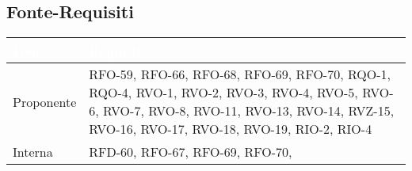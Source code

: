 \subsection{Fonte-Requisiti}
\renewcommand{\arraystretch}{1.45}
\begin{xltabular}{\textwidth}{|X| X |}
    \hline
     \textbf{\textcolor{white}{Fonte}} & \textbf{\textcolor{white}{Requisiti}}\\
    \hline
    \endhead
    Proponente & RFO-59, \newline
                RFO-66, \newline
                RFO-68, \newline
                RFO-69, \newline
                RFO-70, \newline
                RQO-1, \newline
                RQO-4, \newline
                RVO-1, \newline
                RVO-2, \newline
                RVO-3, \newline
                RVO-4, \newline
                RVO-5, \newline
                RVO-6, \newline
                RVO-7, \newline
                RVO-8, \newline
                RVO-11, \newline
                RVO-13, \newline
                RVO-14, \newline
                RVZ-15, \newline
                RVO-16, \newline
                RVO-17, \newline
                RVO-18, \newline
                RVO-19, \newline
                RIO-2, \newline
                RIO-4 \\
    \hline
     Interna &  RFD-60, \newline 
                RFO-67, \newline
                RFO-69, \newline
                RFO-70, \newline

\end{xltabular}
